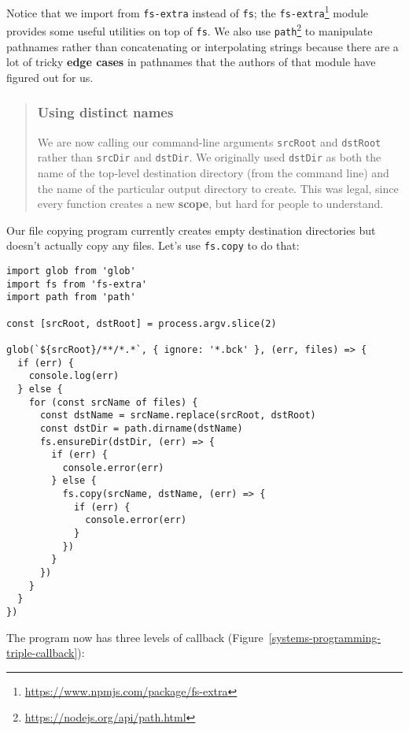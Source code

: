 \documentclass[krantzl]{krantz}
\newcommand{\figref}[1]{Figure~\ref{#1}}
\newcommand{\glossref}[1]{\textbf{#1}}
\newenvironment{callout}{\savenotes\begin{tBox}\begin{quotation}\toggletrue{inbox}\renewcommand{\thempfootnote}{\arabic{footnote}}}{\end{quotation}\vspace{\baselineskip}\end{tBox}\togglefalse{inbox}\spewnotes}
\newcommand{\hreffoot}[2]{{#1}\footnote{\href{#2}{#2}}}
\begin{document}
Notice that we import from \texttt{fs-extra} instead of \texttt{fs};
the \hreffoot{\texttt{fs-extra}}{https://www.npmjs.com/package/fs-extra} module provides some useful utilities on top of \texttt{fs}.
We also use \hreffoot{\texttt{path}}{https://nodejs.org/api/path.html} to manipulate pathnames
rather than concatenating or interpolating strings
because there are a lot of tricky \glossref{edge cases} in pathnames
that the authors of that module have figured out for us.

\begin{callout}


\subsubsection*{Using distinct names}


We are now calling our command-line arguments \texttt{srcRoot} and \texttt{dstRoot}
rather than \texttt{srcDir} and \texttt{dstDir}.
We originally used \texttt{dstDir} as both
the name of the top-level destination directory (from the command line)
and the name of the particular output directory to create.
This was legal,
since every function creates
a new \glossref{scope},
but hard for people to understand.

\end{callout}


Our file copying program currently creates empty destination directories
but doesn’t actually copy any files.
Let’s use \texttt{fs.copy} to do that:


\begin{lstlisting}[frame=tblr]
import glob from 'glob'
import fs from 'fs-extra'
import path from 'path'

const [srcRoot, dstRoot] = process.argv.slice(2)

glob(`${srcRoot}/**/*.*`, { ignore: '*.bck' }, (err, files) => {
  if (err) {
    console.log(err)
  } else {
    for (const srcName of files) {
      const dstName = srcName.replace(srcRoot, dstRoot)
      const dstDir = path.dirname(dstName)
      fs.ensureDir(dstDir, (err) => {
        if (err) {
          console.error(err)
        } else {
          fs.copy(srcName, dstName, (err) => {
            if (err) {
              console.error(err)
            }
          })
        }
      })
    }
  }
})
\end{lstlisting}



The program now has three levels of callback
(\figref{systems-programming-triple-callback}):
\end{document}
